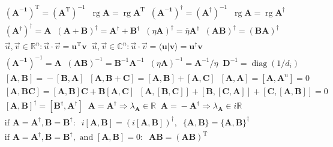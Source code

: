 \begin{align*}
&(\mathbf{A^{-1}})^{\operatorname{T}}\!=\!(\mathbf{A}^{\operatorname{T}})^{-1}\;\;\operatorname{rg}\mathbf{A}\!=\!\operatorname{rg}\mathbf{A}^{\operatorname{T}}\;\;(\mathbf{A^{-1}})^\dagger\!=\!(\mathbf{A}^\dagger)^{-1}\;\;\operatorname{rg}\mathbf{A}\!=\!\operatorname{rg}\mathbf{A}^\dagger \\
&(\mathbf{A}^\dagger)^\dagger\!=\!\mathbf{A}\;\;(\mathbf{A\!+\!B})^\dagger\!=\!\mathbf{A}^\dagger\!+\!\mathbf{B}^\dagger\;\;(\eta\mathbf{A})^\dagger\!=\!\overline{\eta}\mathbf{A}^\dagger\;\;(\mathbf{AB})^\dagger\!=\!(\mathbf{BA})^\dagger \\
&\vec{u},\vec{v}\!\in\!\mathbb{R}^n\!:\vec{u}\cdot\vec{v}\!=\!\mathbf{u}^{\operatorname{T}}\mathbf{v}\;\;\vec{u},\vec{v}\!\in\!\mathbb{C}^n\!:\vec{u}\cdot\vec{v}\!=\!\langle\mathbf{u}|\mathbf{v}\rangle\!=\!\mathbf{u}^\dagger\mathbf{v}\\
&(\mathbf{A^{-1}})^{-1}\!=\!\mathbf{A}\;\;(\mathbf{AB})^{-1}\!=\!\mathbf{B}^{-1}\mathbf{A}^{-1}\;\;(\eta\mathbf{A})^{-1}\!=\!\mathbf{A}^{-1}\!/\eta\;\;\mathbf{D}^{-1}\!=\!\operatorname{diag}(1/d_i) \\
&[\mathbf{A},\mathbf{B}]\!=\!-[\mathbf{B},\mathbf{A}]\;\;[\mathbf{A},\mathbf{B\!+\!C}]\!=\![\mathbf{A},\mathbf{B}]\!+\![\mathbf{A},\mathbf{C}]\;\;[\mathbf{A},\mathbf{A}]\!=\!
[\mathbf{A},\mathbf{A}^n]\!=\!0 \\
&[\mathbf{A},\mathbf{BC}]\!=\![\mathbf{A},\mathbf{B}]\mathbf{C}\!+\!\mathbf{B}[\mathbf{A},\mathbf{C}]\;\;[\mathbf{A},[\mathbf{B},\mathbf{C}]]\!+\![\mathbf{B},[\mathbf{C},\mathbf{A}]]\!+\![\mathbf{C},[\mathbf{A},\mathbf{B}]]\!=\!0 \\
 &[\mathbf{A},\mathbf{B}]^\dagger\!=\![\mathbf{B}^\dagger,\mathbf{A}^\dagger]\;\;\mathbf{A}\!=\!\mathbf{A}^\dagger\!\Rightarrow\!\lambda_\mathbf{A}\!\in\!\mathbb{R}\;\;\mathbf{A}\!=\!-\mathbf{A}^\dagger\!\Rightarrow\!\lambda_\mathbf{A}\!\in\!i\mathbb{R} \\
&\text{if }\mathbf{A}\!=\!\mathbf{A}^\dagger,\mathbf{B}\!=\!\mathbf{B}^\dagger\!:\;\;i[\mathbf{A},\mathbf{B}]\!=\!(i[\mathbf{A},\mathbf{B}])^\dagger,\;\;\{\mathbf{A},\mathbf{B}\}\!=\!\{\mathbf{A},\mathbf{B}\}^\dagger \\
&\text{if }\mathbf{A}\!=\!\mathbf{A}^\dagger,\mathbf{B}\!=\!\mathbf{B}^\dagger,\text{ and }[\mathbf{A},\mathbf{B}]\!=\!0\!:\;\;\mathbf{AB}\!=\!(\mathbf{AB})^{\operatorname{T}}    
\end{align*}







